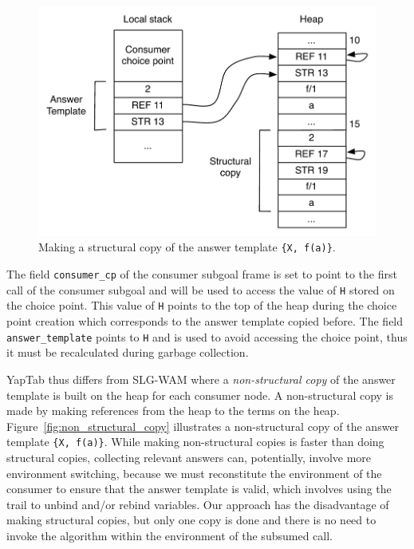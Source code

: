 \begin{figure}[ht]
  \centering
    \includegraphics[scale=0.6]{structural_copy.pdf}
  \caption{Making a structural copy of the answer template \texttt{\{X,~f(a)\}}.}
  \label{fig:structural_copy}
\end{figure}

The field \texttt{consumer\_cp} of the consumer subgoal frame is set to point to the first call
of the consumer subgoal and will be used to access the value of \texttt{H} stored on the choice point.
This value of \texttt{H} points to the top of the heap during the choice point creation which corresponds
to the answer template copied before. The field \texttt{answer\_template} points to \texttt{H}
and is used to avoid accessing the choice point, thus it must be recalculated during garbage collection.

YapTab thus differs from SLG-WAM \cite{Johnson-00} where a \textit{non-structural copy} of the answer template
is built on the heap for each consumer node. A non-structural copy is made by making references from
the heap to the terms on the heap. Figure~\ref{fig:non_structural_copy} illustrates a non-structural
copy of the answer template \texttt{\{X,~f(a)\}}. 
While making non-structural copies is faster than doing structural copies, collecting relevant answers
can, potentially, involve more environment switching, because we must reconstitute the environment of
the consumer to ensure that the answer template is valid, which involves using the trail to unbind
and/or rebind variables. Our approach has the disadvantage of making structural copies, but only one
copy is done and there is no need to invoke the algorithm within the environment of the subsumed call.

